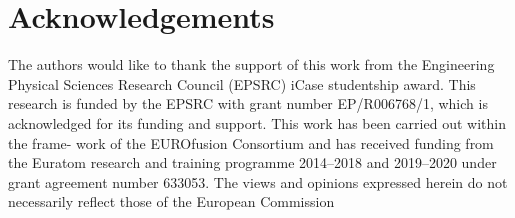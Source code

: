 \documentclass{juliacon}
\begin{document}
\section*{Acknowledgements}

The authors would like to thank the support of this work from the Engineering Physical Sciences Research Council (EPSRC) iCase studentship award. This research is funded by the EPSRC with grant number EP/R006768/1, which is acknowledged for its funding and support. This work has been carried out within the frame- work of the EUROfusion Consortium and has received funding from the Euratom research and training programme 2014–2018 and 2019–2020 under grant agreement number 633053. The views and opinions expressed herein do not necessarily reflect those of the European Commission


\end{document}
